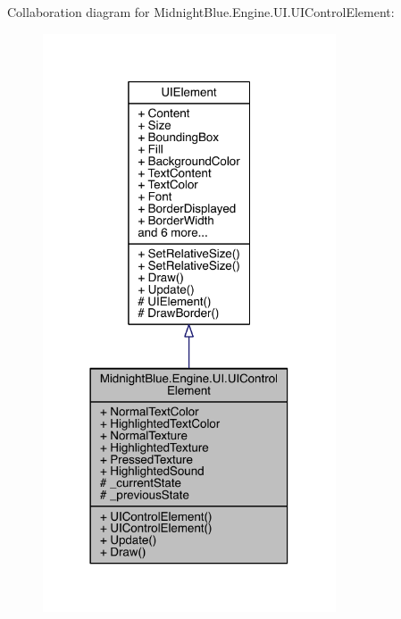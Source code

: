 Collaboration diagram for Midnight\+Blue.\+Engine.\+U\+I.\+U\+I\+Control\+Element\+:
\nopagebreak
\begin{figure}[H]
\begin{center}
\leavevmode
\includegraphics[width=246pt]{class_midnight_blue_1_1_engine_1_1_u_i_1_1_u_i_control_element__coll__graph}
\end{center}
\end{figure}
